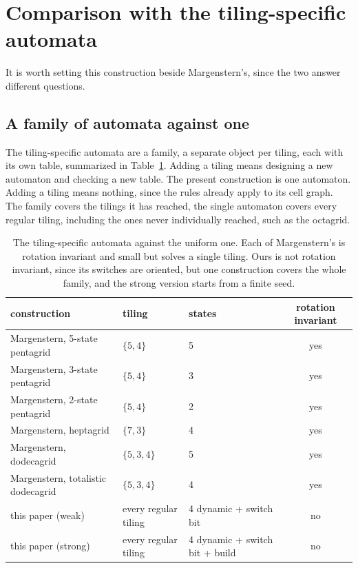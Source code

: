 \section{Comparison with the tiling-specific automata}
\label{sec:comparison}

It is worth setting this construction beside Margenstern's, since the two answer different questions.

\subsection{A family of automata against one}

The tiling-specific automata are a family, a separate object per tiling, each with its own table, summarized in
Table~\ref{tab:compare}. Adding a tiling means designing a new automaton and checking a new table. The present
construction is one automaton. Adding a tiling means nothing, since the rules already apply to its cell graph.
The family covers the tilings it has reached, the single automaton covers every regular tiling, including the
ones never individually reached, such as the octagrid.

\begin{table}[ht]
\centering
\begin{tabular}{@{}lllc@{}}
\toprule
construction & tiling & states & rotation invariant \\
\midrule
Margenstern, 5-state pentagrid \cite{margenstern2014penta5} & $\{5,4\}$ & 5 & yes \\
Margenstern, 3-state pentagrid \cite{margenstern2015penta3} & $\{5,4\}$ & 3 & yes \\
Margenstern, 2-state pentagrid \cite{margenstern2015penta2} & $\{5,4\}$ & 2 & yes \\
Margenstern, heptagrid \cite{margenstern2009hepta} & $\{7,3\}$ & 4 & yes \\
Margenstern, dodecagrid \cite{margenstern2021dodeca5} & $\{5,3,4\}$ & 5 & yes \\
Margenstern, totalistic dodecagrid \cite{margenstern2021dodeca4} & $\{5,3,4\}$ & 4 & yes \\
\midrule
this paper (weak) & every regular tiling & 4 dynamic + switch bit & no \\
this paper (strong) & every regular tiling & 4 dynamic + switch bit + build & no \\
\bottomrule
\end{tabular}
\caption{The tiling-specific automata against the uniform one. Each of Margenstern's is rotation invariant and
small but solves a single tiling. Ours is not rotation invariant, since its switches are oriented, but one
construction covers the whole family, and the strong version starts from a finite seed.}
\label{tab:compare}
\end{table}

